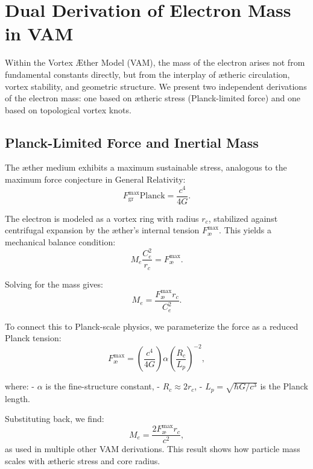 \section{Dual Derivation of Electron Mass in VAM}
\label{appendix:mass-derivation}

Within the Vortex Æther Model (VAM), the mass of the electron arises not from fundamental constants directly, but from the interplay of ætheric circulation, vortex stability, and geometric structure. We present two independent derivations of the electron mass: one based on ætheric stress (Planck-limited force) and one based on topological vortex knots.

\subsection*{Planck-Limited Force and Inertial Mass}
\label{sec:mass-force-balance}

The æther medium exhibits a maximum sustainable stress, analogous to the maximum force conjecture in General Relativity:
\begin{equation*}
    F^{\text{max}}_{\text{gr}}{\text{Planck}} = \frac{c^4}{4G}.
\end{equation*}

The electron is modeled as a vortex ring with radius \( r_c \), stabilized against centrifugal expansion by the æther's internal tension \( F^{\text{max}}_{\text{\ae}} \). This yields a mechanical balance condition:
\begin{equation*}
    M_e \frac{C_e^2}{r_c} = F^{\text{max}}_{\text{\ae}}.
\end{equation*}

Solving for the mass gives:
\begin{equation*}
    M_e = \frac{F^{\text{max}}_{\text{\ae}} r_c}{C_e^2}.
\end{equation*}

To connect this to Planck-scale physics, we parameterize the force as a reduced Planck tension:
\begin{equation*}
    F^{\text{max}}_{\text{\ae}} = \left( \frac{c^4}{4G} \right) \alpha \left( \frac{R_c}{L_p} \right)^{-2},
\end{equation*}

where:
- \( \alpha \) is the fine-structure constant,
- \( R_c \approx 2 r_c \),
- \( L_p = \sqrt{\hbar G / c^3} \) is the Planck length.

Substituting back, we find:
\begin{equation}
    M_e = \frac{2 F^{\text{max}}_{\text{\ae}} r_c}{c^2},
\end{equation}
as used in multiple other VAM derivations. This result shows how particle mass scales with ætheric stress and core radius.

